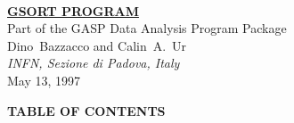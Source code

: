 \topmargin-2cm
\textwidth15cm
\parindent1cm


~\vskip9cm
\begin{center}
{\Large\bf\underline{GSORT PROGRAM}} \\
\bigskip
Part of the GASP Data Analysis Program Package\\
\bigskip
\bigskip
{Dino~Bazzacco and Calin~A.~Ur} \\
\bigskip
{\small\it INFN, Sezione di Padova, Italy}\\
\bigskip
May 13, 1997
\end{center}

\newpage
\begin{center}
{\large\bf TABLE OF CONTENTS} \\
\end{center}
\bigskip
\bigskip

